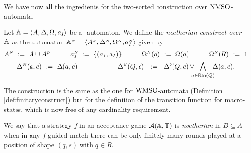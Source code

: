 \noindent We have now all the ingredients for the two-sorted construction over $\mathrm{NMSO}$-automata.

\begin{definition}\label{def:noetherianconstruct}
Let $\mathbb{A} = \langle{A,\Delta,\Omega,a_I}\rangle$ be a {\nmso-automaton}. We define the \emph{noetherian construct over $\mathbb{A}$} as the automaton $\mathbb{A}^{{\scriptscriptstyle N}} = \langle{A^{{\scriptscriptstyle N}},\Delta^{{\scriptscriptstyle N}},\Omega^{{\scriptscriptstyle N}},a_I^{{\scriptscriptstyle N}}}\rangle$ given by %
\begin{gather*}
        A^{{\scriptscriptstyle N}} \ \mathrel{: =} \  A \cup A^{\wp} \quad\quad\quad a_I^{{\scriptscriptstyle N}} \ \mathrel{: =} \  \{(a_I,a_I)\} \quad\quad\quad \Omega^{{\scriptscriptstyle N}}(a) \ \mathrel{: =} \  \Omega(a) \quad\quad\quad \Omega^{{\scriptscriptstyle N}}(R) \ \mathrel{: =} \  1 \\
        \Delta^{{\scriptscriptstyle N}}(a,c) \ \mathrel{: =} \  \Delta(a,c) \qquad \qquad \qquad 
        \Delta^{{\scriptscriptstyle N}}(Q,c) \ \ \mathrel{: =} \ \  \Delta^{\flat}(Q,c) \vee \! \! \! \! \bigwedge_{a \in \mathsf{Ran}(Q)} \! \! \! \Delta(a,c).
      \end{gather*}
\end{definition}
The construction is the same as the one for $\mathrm{WMSO}$-automata (Definition \ref{def:finitaryconstruct}) but for the definition of the transition function for macro-states, which is now free of any cardinality requirement. %

\begin{definition}\label{def:noetherianstrategy}
We say that a strategy $f$ in an acceptance game $\mathcal{A}(\mathbb{A},\mathbb{T})$ is \emph{noetherian} in $B \subseteq A$ when in any $f$-guided match there can be only finitely many rounds played at a position of shape $(q,s)$ with $q \in B$.
\end{definition}


